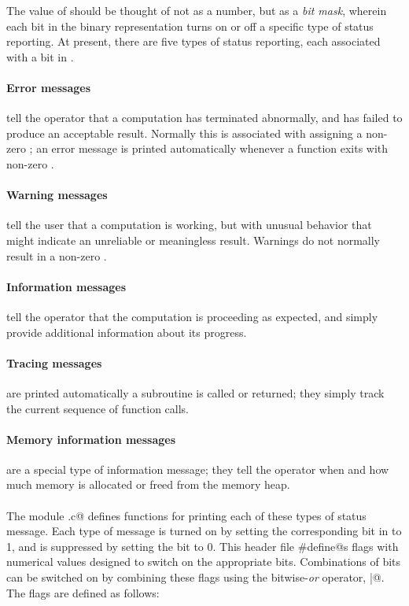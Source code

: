 \documentclass[10pt]{ligodcc}
\begin{document}
The value of \verb@lalDebugLevel@ should be thought of not as a number,
but as a \emph{bit mask}, wherein each bit in the binary
representation turns on or off a specific type of status reporting.
At present, there are five types of status reporting, each associated
with a bit in \verb@lalDebugLevel@.

\paragraph{Error messages} tell the operator that a computation has
terminated abnormally, and has failed to produce an acceptable result.
Normally this is associated with assigning a non-zero
\verb@statusCode@; an error message is printed automatically whenever
a function exits with non-zero \verb@statusCode@.

\paragraph{Warning messages} tell the user that a computation is
working, but with unusual behavior that might indicate an unreliable
or meaningless result.  Warnings do not normally result in a non-zero
\verb@statusCode@.

\paragraph{Information messages} tell the operator that the
computation is proceeding as expected, and simply provide additional
information about its progress.

\paragraph{Tracing messages} are printed automatically a subroutine
is called or returned; they simply track the current sequence of
function calls.

\paragraph{Memory information messages} are a special type of
information message; they tell the operator when and how much memory
is allocated or freed from the memory heap.

\paragraph{}The module \verb@LALError.c@ defines functions for
printing each of these types of status message.  Each type of message
is turned on by setting the corresponding bit in \verb@lalDebugLevel@ to
1, and is suppressed by setting the bit to 0.  This header file
\verb@#define@s flags with numerical values designed to switch on the
appropriate bits.  Combinations of bits can be switched on by
combining these flags using the bitwise-\textit{or} operator,
\verb@|@.  The flags are defined as follows:
\end{document}
